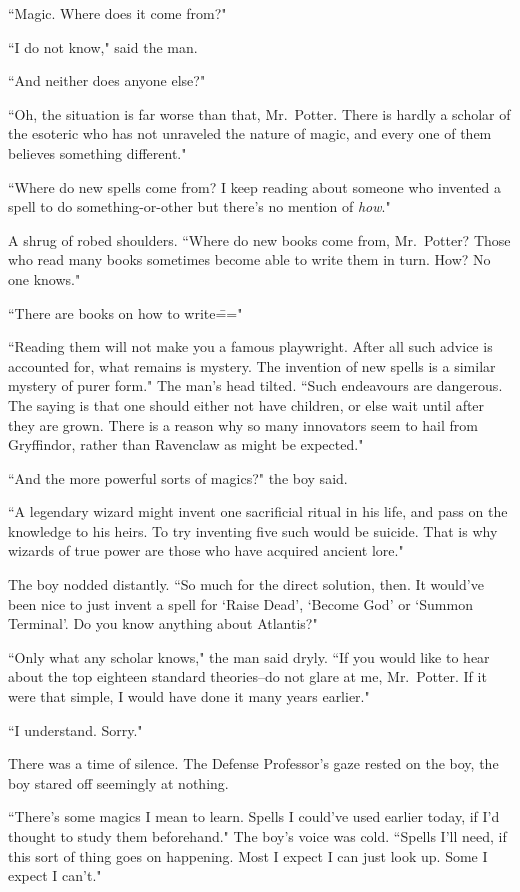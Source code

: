 ``Magic. Where does it come from?"

``I do not know," said the man.

``And neither does anyone else?"

``Oh, the situation is far worse than that, Mr.~Potter. There is hardly a scholar of the esoteric who has not unraveled the nature of magic, and every one of them believes something different."

``Where do new spells come from? I keep reading about someone who invented a spell to do something-or-other but there's no mention of \emph{how}."

A shrug of robed shoulders. ``Where do new books come from, Mr.~Potter? Those who read many books sometimes become able to write them in turn. How? No one knows."

``There are books on how to write\==="

``Reading them will not make you a famous playwright. After all such advice is accounted for, what remains is mystery. The invention of new spells is a similar mystery of purer form." The man's head tilted. ``Such endeavours are dangerous. The saying is that one should either not have children, or else wait until after they are grown. There is a reason why so many innovators seem to hail from Gryffindor, rather than Ravenclaw as might be expected."

``And the more powerful sorts of magics?" the boy said.

``A legendary wizard might invent one sacrificial ritual in his life, and pass on the knowledge to his heirs. To try inventing five such would be suicide. That is why wizards of true power are those who have acquired ancient lore."

The boy nodded distantly. ``So much for the direct solution, then. It would've been nice to just invent a spell for `Raise Dead', `Become God' or `Summon Terminal'. Do you know anything about Atlantis?"

``Only what any scholar knows," the man said dryly. ``If you would like to hear about the top eighteen standard theories\---do not glare at me, Mr.~Potter. If it were that simple, I would have done it many years earlier."

``I understand. Sorry."

There was a time of silence. The Defense Professor's gaze rested on the boy, the boy stared off seemingly at nothing.

``There's some magics I mean to learn. Spells I could've used earlier today, if I'd thought to study them beforehand." The boy's voice was cold. ``Spells I'll need, if this sort of thing goes on happening. Most I expect I can just look up. Some I expect I can't."

